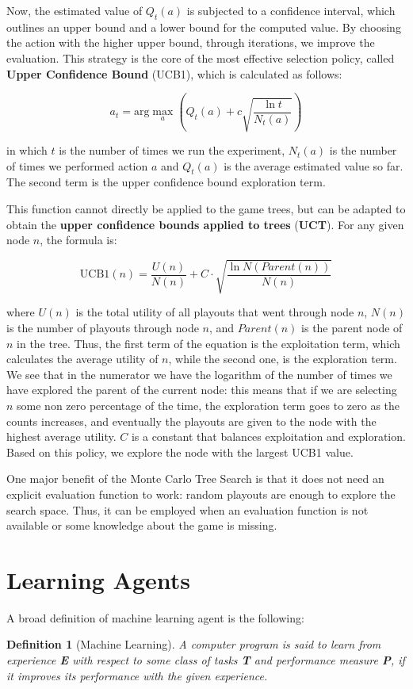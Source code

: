 \documentclass{article}
\newtheorem{definition}{Definition}
\begin{document}
Now, the estimated value of $Q_t(a)$ is subjected to a confidence interval, which outlines an upper bound and a lower bound for the computed value. By choosing the action with the higher upper bound, through iterations, we improve the evaluation. This strategy is the core of the most effective selection policy, called \textbf{Upper Confidence Bound}  (UCB1), which is calculated as follows:
    
    $$a_t = \text{arg}\max_a \left (Q_t(a)+c\sqrt{\frac{\ln{t}}{N_t(a)}}\right )$$

\noindent
in which $t$ is the number of times we run the experiment, $N_t(a)$ is the number of times we performed action $a$ and $Q_t(a)$ is the average estimated value so far. The second term is the upper confidence bound exploration term.

This function cannot directly be applied to the game trees, but can be adapted to obtain the \textbf{upper confidence bounds applied to trees} (\textbf{UCT}). For any given node $n$, the formula is:

$$\text{UCB1}(n) = \frac{U(n)}{N(n)}+C\cdot\sqrt{\frac{\ln{N(Parent(n))}}{N(n)}}$$

\noindent where $U(n)$ is the total utility of all playouts that went through node $n$, $N(n)$ is the number of playouts through node $n$, and $Parent(n)$ is the parent node of $n$ in the tree. Thus, the first term of the equation is the exploitation term, which calculates the average utility of $n$, while the second one, is the exploration term. We see that in the numerator we have the logarithm of the number of times we have explored the parent of the current node: this means that if we are selecting $n$ some non zero percentage of the time, the exploration term goes to zero as the counts increases, and eventually the playouts are given to the node with the highest average utility. $C$ is a constant that balances exploitation and exploration. Based on this policy, we explore the node with the largest UCB1 value.

One major benefit of the Monte Carlo Tree Search is that it does not need an explicit evaluation function to work: random playouts are enough to explore the search space. Thus, it can be employed when an evaluation function is not available or some knowledge about the game is missing.

\clearpage
\section{Learning Agents} 
A broad definition of machine learning agent is the following:
\begin{definition}[Machine Learning]
    A computer program is said to learn from experience \textbf{E} with respect to some class of tasks \textbf{T} and performance measure \textbf{P}, if it improves its performance with the given experience.
\end{definition}
\end{document}
